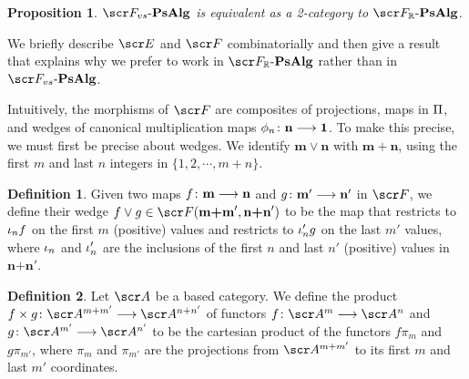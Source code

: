 \documentclass{amsart}
\newtheorem{prop}{Proposition}[section]
\theoremstyle{definition}
\newtheorem{defn}{Definition}[section]
\numberwithin{equation}{section}
\newcommand{\bm}{\mathbf{m}}
\newcommand{\bn}{\mathbf{n}}
\newcommand{\FPs}{\sF_{vs}\text{-}\mathbf{PsAlg}}
\newcommand{\FPR}{\sF_{\bR}\text{-}\mathbf{PsAlg}}
\begin{document}
\begin{prop}\label{FPsFPR}
$\FPs$ is equivalent as a 2-category to $\FPR$. 
\end{prop}

We briefly describe $\sE$ and $\sF$ combinatorially and then give a result that explains why we prefer to work in $\FPR$ rather than in $\FPs$. 
 
Intuitively, the morphisms of $\sF$ are composites of projections, maps in $\Pi$, and wedges of canonical multiplication maps $\phi_n \colon \textbf{n} \longrightarrow \textbf{1}$. To make this  precise, we must first be precise about wedges.  We identify $\bm\vee\bn$ with $\mathbf{m+n}$, using the first $m$ and last $n$ integers in $\{1, 2, \cdots, m+n\}$.

\begin{defn}
 Given two maps $f \colon \textbf{m} \longrightarrow \textbf{n}$ and $g \colon \textbf{m}' \longrightarrow \textbf{n}'$ in $\sF$, we define their wedge $f \vee g \in \sF(\textbf{m+m}', \textbf{n+n}')$ to be the map that restricts to $\iota_n f$ on the first $m$ (positive) values  and restricts to $\iota_{n}'g$ on the last $m'$ values, where 
$\iota_n $ and $\iota_{n}'$ are the inclusions of the first $n$ and last $n'$ (positive) values in $\textbf{n+n}'$.
\end{defn}

\begin{defn} Let $\sA$ be a based category.  We define the product  \linebreak
$f\times g \colon \sA^{m+m'}\rtarr \sA^{n+n'}$ 
of functors $f\colon \sA^m\rtarr \sA^n$ and $g\colon \sA^{m'}\rtarr \sA^{n'}$ to be the cartesian product of the functors $f\pi_m$ and $g\pi_{m'}$, 
%
where $\pi_m$ and $\pi_{m'}$ are the projections from  $\sA^{m+m'}$ to its first $m$ and  last $m'$ coordinates.
\end{defn}
\end{document}
